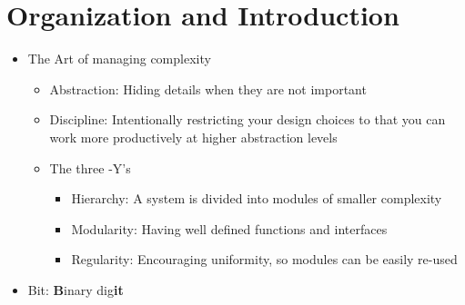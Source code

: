 \documentclass[a4paper]{article}
\begin{document}



\section{Organization and Introduction}
\begin{itemize}
\item The Art of managing complexity
\begin{itemize}
\item Abstraction: Hiding details when they are not important
\item Discipline: Intentionally restricting your design choices to that you can work more productively at higher abstraction levels
\item The three -Y's
\begin{itemize}
\item Hierarchy: A system is divided into modules of smaller complexity
\item Modularity: Having well defined functions and interfaces
\item Regularity: Encouraging uniformity, so modules can be easily re-used
\end{itemize}
\end{itemize}
\item Bit: \textbf{B}inary dig\textbf{it}
\end{itemize}
\end{document}
